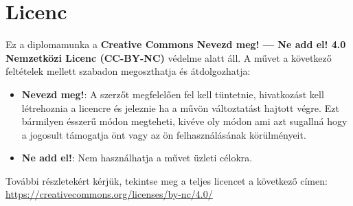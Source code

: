 \chapter*{Licenc}

Ez a diplomamunka a \textbf{Creative Commons Nevezd meg! --- Ne add el! 4.0 Nemzetközi Licenc (CC-BY-NC)} védelme alatt
áll. A művet a következő feltételek mellett szabadon megoszthatja és átdolgozhatja:

\begin{itemize}
    \item \textbf{Nevezd meg!}: A szerzőt megfelelően fel kell tüntetnie, hivatkozást kell létrehoznia a licencre és
          jeleznie ha a művön változtatást hajtott végre. Ezt bármilyen ésszerű módon megteheti, kivéve oly módon ami
          azt sugallná hogy a jogosult támogatja önt vagy az ön felhasználásának körülményeit.
    \item \textbf{Ne add el!}: Nem használhatja a művet üzleti célokra.
\end{itemize}

További részletekért kérjük, tekintse meg a teljes licencet a következő címen: \\
\url{https://creativecommons.org/licenses/by-nc/4.0/}
